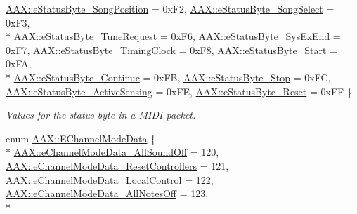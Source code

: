 \begin{DoxyCompactItemize}
\hyperlink{a00288_a007db6cfa461dbbb87e49e2ec52e18b0ae7680a77d66673ac2900d2dac14270a0}{A\+A\+X\+::e\+Status\+Byte\+\_\+\+Song\+Position} = 0x\+F2, 
\hyperlink{a00288_a007db6cfa461dbbb87e49e2ec52e18b0a50a0b1fcddf5b5e29ee71320edd520eb}{A\+A\+X\+::e\+Status\+Byte\+\_\+\+Song\+Select} = 0x\+F3, 
\\*
\hyperlink{a00288_a007db6cfa461dbbb87e49e2ec52e18b0a221fd3d2a1f7b77fea14a357f0f9fd7f}{A\+A\+X\+::e\+Status\+Byte\+\_\+\+Tune\+Request} = 0x\+F6, 
\hyperlink{a00288_a007db6cfa461dbbb87e49e2ec52e18b0af9541f1f98702a20d7d9a7a25589b3a1}{A\+A\+X\+::e\+Status\+Byte\+\_\+\+Sys\+Ex\+End} = 0x\+F7, 
\hyperlink{a00288_a007db6cfa461dbbb87e49e2ec52e18b0af301c0c5c67e4e67ff30ecff79713ddc}{A\+A\+X\+::e\+Status\+Byte\+\_\+\+Timing\+Clock} = 0x\+F8, 
\hyperlink{a00288_a007db6cfa461dbbb87e49e2ec52e18b0afd1a3d5e51ff91a7ed408905daafb292}{A\+A\+X\+::e\+Status\+Byte\+\_\+\+Start} = 0x\+F\+A, 
\\*
\hyperlink{a00288_a007db6cfa461dbbb87e49e2ec52e18b0a0c7a5ef4d50503e4b1c15f67fd4da75f}{A\+A\+X\+::e\+Status\+Byte\+\_\+\+Continue} = 0x\+F\+B, 
\hyperlink{a00288_a007db6cfa461dbbb87e49e2ec52e18b0a5d405fc8e8ffd1a5fdf6179933d945e3}{A\+A\+X\+::e\+Status\+Byte\+\_\+\+Stop} = 0x\+F\+C, 
\hyperlink{a00288_a007db6cfa461dbbb87e49e2ec52e18b0a3efefd89a761be230e693dc4794611df}{A\+A\+X\+::e\+Status\+Byte\+\_\+\+Active\+Sensing} = 0x\+F\+E, 
\hyperlink{a00288_a007db6cfa461dbbb87e49e2ec52e18b0af4d1ba261ba284f8c08bc6d2a65c287c}{A\+A\+X\+::e\+Status\+Byte\+\_\+\+Reset} = 0x\+F\+F
 \}
\begin{DoxyCompactList}\small\item\em Values for the status byte in a M\+I\+D\+I packet. \end{DoxyCompactList}\item 
enum \hyperlink{a00288_a51c6649733dc2e7ce2364c7b52ddf461}{A\+A\+X\+::\+E\+Channel\+Mode\+Data} \{ \\*
\hyperlink{a00288_a51c6649733dc2e7ce2364c7b52ddf461ac068c1ac0762ad50b948d99f21ac09f5}{A\+A\+X\+::e\+Channel\+Mode\+Data\+\_\+\+All\+Sound\+Off} = 120, 
\hyperlink{a00288_a51c6649733dc2e7ce2364c7b52ddf461a540ae94290aa31508a9060e1b9676891}{A\+A\+X\+::e\+Channel\+Mode\+Data\+\_\+\+Reset\+Controllers} = 121, 
\hyperlink{a00288_a51c6649733dc2e7ce2364c7b52ddf461addf1f5adef10e202e8378fc15521f1ff}{A\+A\+X\+::e\+Channel\+Mode\+Data\+\_\+\+Local\+Control} = 122, 
\hyperlink{a00288_a51c6649733dc2e7ce2364c7b52ddf461af57995480ec44ebcb6b936042a471979}{A\+A\+X\+::e\+Channel\+Mode\+Data\+\_\+\+All\+Notes\+Off} = 123, 
\\*

\end{DoxyCompactItemize}
